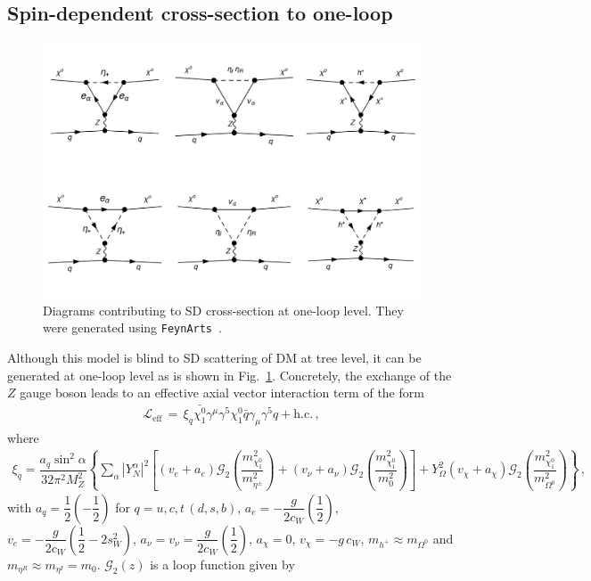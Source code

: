 \documentclass[12pt,letterpaper]{article}
\begin{document}
\subsection{Spin-dependent cross-section to one-loop}
\label{sec:sigma-SD}

\begin{figure}[h]
\begin{center}
\includegraphics[scale=0.45]{SD-diagrams}
\caption{Diagrams contributing to SD cross-section at one-loop level. They were generated using \texttt{FeynArts}~\cite{Hahn:2000kx}. }
\label{fig:SD}
\end{center}
\end{figure}
Although this model is blind to SD scattering of DM at tree level, it can be generated at one-loop level as is shown in Fig.~\ref{fig:SD}. 
Concretely,  the exchange of the  $Z$ gauge boson leads to an effective axial vector interaction term of the form~\cite{Jungman:1995df, Ibarra:2016dlb}
\begin{align}
\label{eq:LSD-eff}
\mathcal{L}_{\text{eff}}\, =\, \xi_q \bar{\chi^0_1}\gamma^{\mu}\gamma^5 \chi^0_1 \bar{q}\gamma_{\mu}\gamma^5q + \text{h.c.}\,,
\end{align}
where
\begin{align}
\label{eq:xiq}
\xi_q = \dfrac{a_q \sin^2\alpha }{32\pi^2M_Z^2}
\left\{
\sum_{\alpha}|Y_N^{\alpha} |^2\left[
(v_{e}+a_{e}) \mathcal{G}_2\left(\dfrac{m_{\chi^0_1}^2}{m_{\eta^{\pm}}^2}\right) 
+ (v_{\nu}+a_{\nu}) \mathcal{G}_2\left(\dfrac{m_{\chi^0_1}^2}{m_0^2}\right) 
\right]
+ 
Y_{\Omega}^2(v_{\chi}+a_{\chi}) \mathcal{G}_2\left(\dfrac{m_{\chi^0_1}^2}{m_{\Omega^0}^2}\right) 
\right\}\,,
\end{align}
with $a_q = \dfrac{1}{2} \left(-\dfrac{1}{2}\right)$ for $q=u,c,t\, (d,s,b)$, $a_{e} = -\dfrac{g}{2c_W}\left(\dfrac{1}{2}\right)$, $v_{e} = -\dfrac{g}{2c_W}\left(\dfrac{1}{2}-2s^2_W \right)$, $a_\nu = v_\nu = \dfrac{g}{2c_W}\left(\dfrac{1}{2}\right)$, $a_{\chi} = 0$, $v_{\chi} = -g\, c_W$, $m_{h^+}\approx m_{\Omega^0}$ and $ m_{\eta^R}\approx m_{\eta^I}=m_0$. $\mathcal{G}_2(z)$ is a loop function given by
\end{document}
